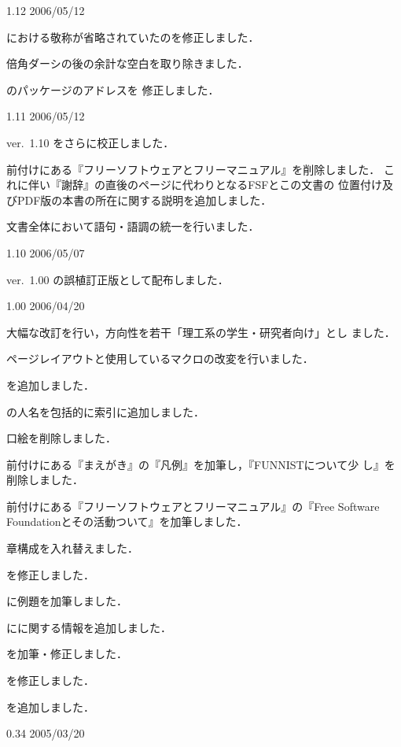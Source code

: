 \begin{changelog}
 \item[1.12 2006/05/12] %
   \item {}における敬称が省略されていたのを修正しました．
   \item 倍角ダーシの後の余計な空白を取り除きました．
   \item {}のパッケージのアドレスを
   修正しました．
 \item[1.11 2006/05/12] %
   \item ver.~1.10 をさらに校正しました．
   \item 前付けにある『フリーソフトウェアとフリーマニュアル』を削除しました．
   これに伴い『謝辞』の直後のページに代わりとなるFSFとこの文書の
   位置付け及びPDF版の本書の所在に関する説明を追加しました．
   \item 文書全体において語句・語調の統一を行いました．
 \item[1.10 2006/05/07] %
   \item ver.~1.00 の誤植訂正版として配布しました．
 \item[1.00 2006/04/20] %
   \item 大幅な改訂を行い，方向性を若干「理工系の学生・研究者向け」とし
   ました．
   \item ページレイアウトと使用しているマクロの改変を行いました．
   \item {}を追加しました．
   \item {}の人名を包括的に索引に追加しました．
   \item 口絵を削除しました．
   \item 前付けにある『まえがき』の『凡例』を加筆し，『FUNNISTについて少
   し』を削除しました．
   \item 前付けにある『フリーソフトウェアとフリーマニュアル』の『Free
   Software Foundationとその活動ついて』を加筆しました．
   \item 章構成を入れ替えました．
   \item {}を修正しました．
   \item {}に例題を加筆しました．
   \item {}に\AmSLaTeX に関する情報を追加しました．
   \item {}を加筆・修正しました．
   \item {}を修正しました．
   \item {}を追加しました．
 \item[0.34 2005/03/20] %

\end{changelog}
